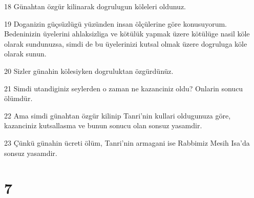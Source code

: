 \par 18 Günahtan özgür kilinarak dogrulugun köleleri oldunuz.
\par 19 Doganizin güçsüzlügü yüzünden insan ölçülerine göre konusuyorum. Bedeninizin üyelerini ahlaksizliga ve kötülük yapmak üzere kötülüge nasil köle olarak sundunuzsa, simdi de bu üyelerinizi kutsal olmak üzere dogruluga köle olarak sunun.
\par 20 Sizler günahin kölesiyken dogruluktan özgürdünüz.
\par 21 Simdi utandiginiz seylerden o zaman ne kazanciniz oldu? Onlarin sonucu ölümdür.
\par 22 Ama simdi günahtan özgür kilinip Tanri'nin kullari oldugunuza göre, kazanciniz kutsallasma ve bunun sonucu olan sonsuz yasamdir.
\par 23 Çünkü günahin ücreti ölüm, Tanri'nin armagani ise Rabbimiz Mesih Isa'da sonsuz yasamdir.

\chapter{7}


